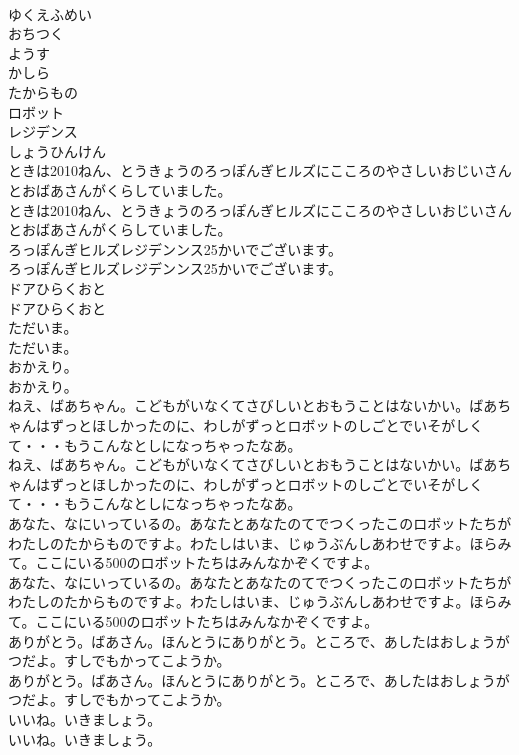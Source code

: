 \documentclass[8pt]{extreport}
\begin{document}
\begin{CJK}{UTF8}{min}
\\	ゆくえふめい
\\	おちつく
\\	ようす
\\	かしら
\\	たからもの
\\	ロボット
\\	レジデンス
\\	しょうひんけん
\\	ときは2010ねん、とうきょうのろっぽんぎヒルズにこころのやさしいおじいさんとおばあさんがくらしていました。
\\	ときは2010ねん、とうきょうのろっぽんぎヒルズにこころのやさしいおじいさんとおばあさんがくらしていました。
\\	ろっぽんぎヒルズレジデンンス25かいでございます。
\\	ろっぽんぎヒルズレジデンンス25かいでございます。
\\	ドアひらくおと
\\	ドアひらくおと
\\	ただいま。
\\	ただいま。
\\	おかえり。
\\	おかえり。
\\	ねえ、ばあちゃん。こどもがいなくてさびしいとおもうことはないかい。ばあちゃんはずっとほしかったのに、わしがずっとロボットのしごとでいそがしくて・・・もうこんなとしになっちゃったなあ。
\\	ねえ、ばあちゃん。こどもがいなくてさびしいとおもうことはないかい。ばあちゃんはずっとほしかったのに、わしがずっとロボットのしごとでいそがしくて・・・もうこんなとしになっちゃったなあ。
\\	あなた、なにいっているの。あなたとあなたのてでつくったこのロボットたちがわたしのたからものですよ。わたしはいま、じゅうぶんしあわせですよ。ほらみて。ここにいる500のロボットたちはみんなかぞくですよ。
\\	あなた、なにいっているの。あなたとあなたのてでつくったこのロボットたちがわたしのたからものですよ。わたしはいま、じゅうぶんしあわせですよ。ほらみて。ここにいる500のロボットたちはみんなかぞくですよ。
\\	ありがとう。ばあさん。ほんとうにありがとう。ところで、あしたはおしょうがつだよ。すしでもかってこようか。
\\	ありがとう。ばあさん。ほんとうにありがとう。ところで、あしたはおしょうがつだよ。すしでもかってこようか。
\\	いいね。いきましょう。
\\	いいね。いきましょう。

\end{CJK}
\end{document}
